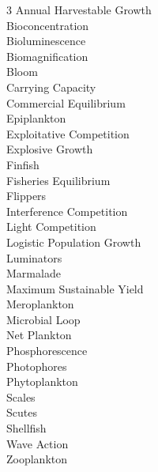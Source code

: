 
\begin{multicols}{3}
Annual Harvestable Growth\\
Bioconcentration\\
Bioluminescence\\
Biomagnification\\
Bloom\\
Carrying Capacity\\
Commercial Equilibrium\\
Epiplankton\\
Exploitative Competition\\
Explosive Growth\\
Finfish \\
Fisheries Equilibrium\\
Flippers\\
Interference Competition\\
Light Competition\\
Logistic Population Growth\\
Luminators\\
Marmalade\\
Maximum Sustainable Yield\\
Meroplankton\\
Microbial Loop\\
Net Plankton\\
Phosphorescence\\
Photophores\\
Phytoplankton\\
Scales\\
Scutes\\
Shellfish\\
Wave Action\\
Zooplankton
\end{multicols}